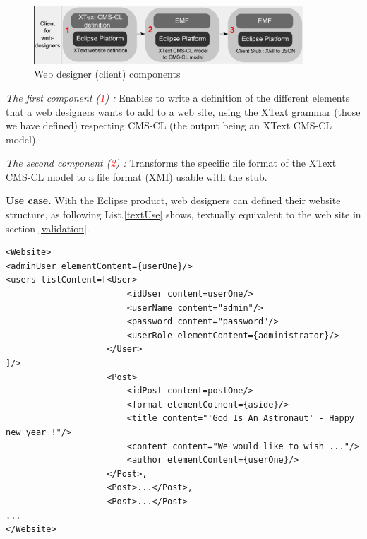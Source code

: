 	\begin{figure}[!h]
		\centering
		\includegraphics[width=0.90\textwidth]{../resources/pdf/final_WebDesignerClient_Server_numbered.pdf}
		\caption{Web designer (client) components}
		\label{wdCompos}
	\end{figure}		
		
	\vspace{0.15em}
	\noindent\textit{The first component (\textcolor{red}{1}) :} Enables to write a definition of the different elements that a web designers wants to 		add to a web site, using the XText grammar (those we have defined) respecting CMS-CL (the output being an XText CMS-CL model).
	
	\vspace{0.15em}
	\noindent\textit{The second component (\textcolor{red}{2}) :} Transforms the specific file format of the XText CMS-CL model to a file format (XMI) 		usable with the stub.
	
	\vspace{0.15em}
	\noindent\textbf{Use case.} With the Eclipse product, web designers can defined their website structure, as following List.\ref{textUse} shows, textually equivalent to the web site in section \ref{validation}.
	\lstset{
  								caption=Web site textual representation, 
  								label=textUse,
 								basicstyle=\scriptsize,
  								xleftmargin=.060\columnwidth , xrightmargin=.060\columnwidth
						}
	\begin{lstlisting}
<Website>
<adminUser elementContent={userOne}/>
<users listContent=[<User>
						<idUser content=userOne/>
						<userName content="admin"/>
						<password content="password"/>
						<userRole elementContent={administrator}/>
					</User>
]/>
					<Post>
						<idPost content=postOne/>
						<format elementCotnent={aside}/>
						<title content="'God Is An Astronaut' - Happy new year !"/>
						<content content="We would like to wish ..."/>
						<author elementContent={userOne}/>
					</Post>,
					<Post>...</Post>,
					<Post>...</Post>
...
</Website>											
\end{lstlisting}

	
